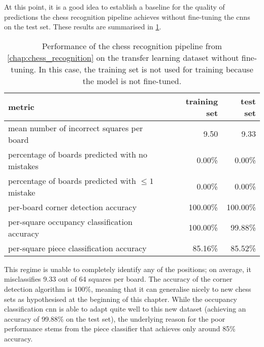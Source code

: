 \documentclass[../report.tex]{subfiles}
\begin{document}
At this point, it is a good idea to establish a baseline for the quality of predictions the chess recognition pipeline achieves without fine-tuning the \glspl{cnn} on the test set.
These results are summarised in \cref{tbl:transfer_learning_results_without_finetuning}.
\begin{table}
    \centering
    \begin{tabular}{lrr}
        \toprule
        metric & training set & test set \\
        \midrule
        mean number of incorrect squares per board           & 9.50     & 9.33 \\
        percentage of boards predicted with no mistakes      & 0.00\%   & 0.00\%   \\
        percentage of boards predicted with $\leq 1$ mistake & 0.00\%   & 0.00\%   \\
        per-board corner detection accuracy                  & 100.00\% & 100.00\% \\
        per-square occupancy classification accuracy         & 100.00\% & 99.88\% \\
        per-square piece classification accuracy             & 85.16\%  & 85.52\% \\
        \bottomrule
    \end{tabular}
    \caption[Performance of the chess recognition pipeline from \cref{chap:chess_recognition} on the transfer learning dataset without fine-tuning.]{Performance of the chess recognition pipeline from \cref{chap:chess_recognition} on the transfer learning dataset without fine-tuning. In this case, the training set is not used for training because the model is not fine-tuned.}
    \label{tbl:transfer_learning_results_without_finetuning}
\end{table}
This regime is unable to completely identify any of the positions; on average, it misclassifies 9.33 out of 64 squares per board.
The accuracy of the corner detection algorithm is 100\%, meaning that it can generalise nicely to new chess sets as hypothesised at the beginning of this chapter.
While the occupancy classification \gls{cnn} is able to adapt quite well to this new dataset (achieving an accuracy of 99.88\% on the test set), the underlying reason for the poor performance stems from the piece classifier that achieves only around 85\% accuracy.
\end{document}
